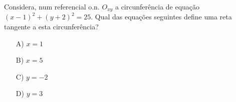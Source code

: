 Considera, num referencial o.n. $O_{xy}$ a circunferência de equação $(x-1)^2 + (y+2)^2 = 25$. Qual das equações seguintes define uma reta tangente a esta circunferência?
\begin{enumerate}
\item [A)] $x=1$
\item [B)] $x=5$
\item [C)] $y = -2$
\item [D)] $ y=3$
\end{enumerate}